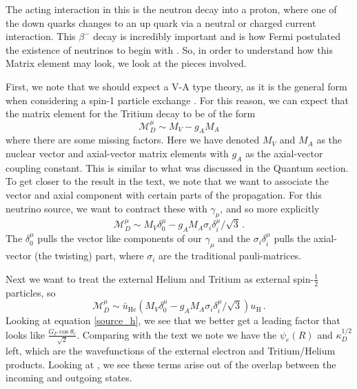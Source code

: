\documentclass[10pt]{article}
\begin{document}
The acting interaction in this is the neutron decay into a proton, where one of the down quarks changes to an up quark via a neutral or charged current interaction. This $\beta^{-}$ decay is incredibly important and is how Fermi postulated the existence of neutrinos to begin with \cite{ft_beta}. So, in order to understand how this Matrix element may look, we look at the pieces involved.

First, we note that we should expect a V-A type theory, as it is the general form when considering a spin-1 particle exchange \cite{ft_beta}. For this reason, we can expect that the matrix element for the Tritium decay to be of the form
\begin{equation}
  \mathcal{M}_{D}^{\mu} \sim M_{V} - g_{A}M_{A}
\end{equation}
where there are some missing factors. Here we have denoted $M_{V}$ and $M_{A}$ as the nuclear vector and axial-vector matrix elements with $g_{A}$ as the axial-vector coupling constant. This is similar to what was discussed in the Quantum section. To get closer to the result in the text, we note that we want to associate the vector and axial component with certain parts of the propagation. For this neutrino source, we want to contract these with $\gamma_{\mu}$, and so more explicitly
\begin{equation}
  \mathcal{M}_{D}^{\mu} \sim M_{V}\delta^{\mu}_{0} - g_{A}M_{A}\sigma_{i}\delta^{\mu}_{i}/\sqrt{3}\, .
\end{equation}
The $\delta^{\mu}_{0}$ pulls the vector like components of our $\gamma_{\mu}$ and the $\sigma_{i}\delta^{\mu}_{i}$ pulls the axial-vector (the twisting) part, where $\sigma_{i}$ are the traditional pauli-matrices.   

Next we want to treat the external Helium and Tritium as external spin-$\frac{1}{2}$ particles, so
\begin{equation}
  \mathcal{M}_{D}^{\mu} \sim \bar{u}_{\text{He}}\left(M_{V}\delta^{\mu}_{0} - g_{A}M_{A}\sigma_{i}\delta^{\mu}_{i}/\sqrt{3}\right)u_{\text{H}}\, .
\end{equation}
Looking at equation \ref{source_h}, we see that we better get a leading factor that looks like $\frac{G_{F}\cos\theta_{c}}{\sqrt{2}}$. Comparing with the text \cite{Akhmedov_2008} we note we have the $\psi_{e}(R)$ and $\kappa_{D}^{1/2}$ left, which are the wavefunctions of the external electron and Tritium/Helium products. Looking at \cite{Beuthe_2003}, we see these terms arise out of the overlap between the incoming and outgoing states.
\end{document}
